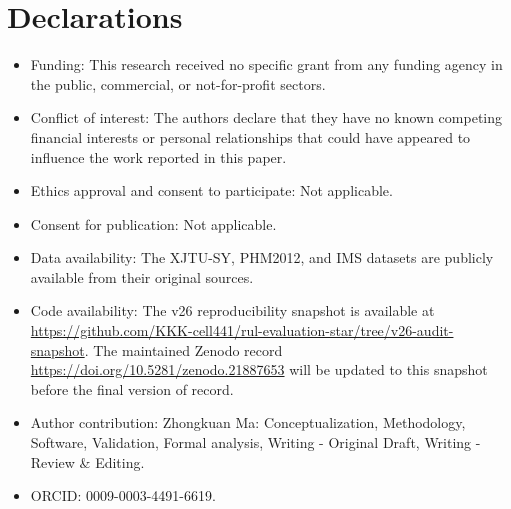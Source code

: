 \documentclass[pdflatex,sn-basic,NameDate]{sn-jnl}
\begin{document}
\section*{Declarations}
\begin{itemize}
\item Funding: This research received no specific grant from any funding agency in the public, commercial, or not-for-profit sectors.
\item Conflict of interest: The authors declare that they have no known competing financial interests or personal relationships that could have appeared to influence the work reported in this paper.
\item Ethics approval and consent to participate: Not applicable.
\item Consent for publication: Not applicable.
\item Data availability: The XJTU-SY, PHM2012, and IMS datasets are publicly available from their original sources.
\item Code availability: The v26 reproducibility snapshot is available at \url{https://github.com/KKK-cell441/rul-evaluation-star/tree/v26-audit-snapshot}. The maintained Zenodo record \url{https://doi.org/10.5281/zenodo.21887653} will be updated to this snapshot before the final version of record.
\item Author contribution: Zhongkuan Ma: Conceptualization, Methodology, Software, Validation, Formal analysis, Writing - Original Draft, Writing - Review \& Editing.
\item ORCID: 0009-0003-4491-6619.
\end{itemize}
\end{document}
